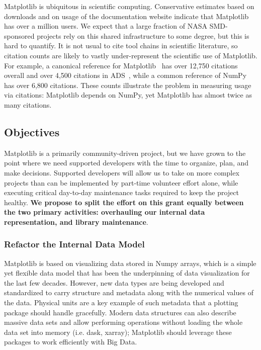 \documentclass[12pt]{article}
\numberwithin{page}{section}
\begin{document}
Matplotlib is ubiquitous in scientific computing.  Conservative
estimates based on downloads and on usage of the documentation website
indicate that Matplotlib has over a million users.  We expect that a
large fraction of NASA SMD-sponsored projects rely on this shared
infrastructure to some degree, but this is hard to quantify.
It is not usual to cite tool chains in scientific literature, so
citation counts are likely to vastly under-represent the scientific
use of Matplotlib.  For example, a canonical reference for
Matplotlib~\cite{Hunter:2007} has over 12,750 citations overall and
over 4,500 citations in ADS~\cite{ads_mpl},
while a common reference of NumPy~\cite{walt2011numpy} has over 6,800
citations. These counts illustrate the problem in measuring usage via
citations: Matplotlib depends on NumPy, yet Matplotlib has almost
twice as many citations.

\subsection{Objectives}



Matplotlib is a primarily community-driven project, but we have grown
to the point where we need supported developers with the time to
organize, plan, and make decisions.  Supported developers will allow
us to take on more complex projects than can be implemented by part-time
volunteer effort alone, while executing critical day-to-day
maintenance tasks required to keep the project healthy.
\textbf{We propose to split the effort on this grant equally between
  the two primary activities: overhauling our internal data representation, and library
  maintenance}.


\subsubsection{Refactor the Internal Data Model}
\label{sec:ridm}

Matplotlib is based on visualizing data stored in Numpy arrays,
which is a simple yet flexible data model that has been the
underpinning of data visualization for the last few decades.  However,
new data types are being developed and standardized to carry
structure and metadata along with the numerical values of the data.
Physical units are a key example of such metadata
that a plotting package should handle gracefully.  Modern data
structures can also describe massive data sets and allow performing
operations without loading the whole data set into memory
(i.e. dask, xarray); Matplotlib should leverage these packages
to work efficiently with Big Data.
\end{document}
